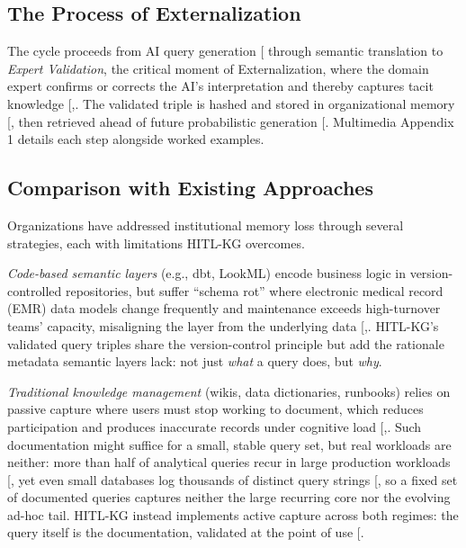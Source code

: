 \documentclass[
  american,
  11pt,
  letterpaper,
  oneside  ,captions=tableheading
]{scrartcl}
\begin{document}
\subsection{The Process of
Externalization}\label{the-process-of-externalization}

The cycle proceeds from AI query generation
{[}\citeproc{ref-lee2023}{28}{]} through semantic translation to
\emph{Expert Validation}, the critical moment of Externalization, where
the domain expert confirms or corrects the AI's interpretation and
thereby captures tacit knowledge
{[},\citeproc{ref-mosqueirarey2023}{30}{]}.
The validated triple is hashed and stored in organizational memory
{[}\citeproc{ref-benbya2004}{31}{]}, then retrieved ahead of future
probabilistic generation {[}\citeproc{ref-whittaker2008}{32}{]}.
Multimedia Appendix 1 details each step alongside worked examples.

\subsection{Comparison with Existing
Approaches}\label{comparison-with-existing-approaches}

Organizations have addressed institutional memory loss through several
strategies, each with limitations HITL-KG overcomes.

\emph{Code-based semantic layers} (e.g., dbt, LookML) encode business
logic in version-controlled repositories, but suffer ``schema rot''
where electronic medical record (EMR) data models change frequently and
maintenance exceeds high-turnover teams' capacity, misaligning the layer
from the underlying data
{[},\citeproc{ref-battula2025}{34}{]}.
HITL-KG's validated query triples share the version-control principle
but add the rationale metadata semantic layers lack: not just
\emph{what} a query does, but \emph{why}.

\emph{Traditional knowledge management} (wikis, data dictionaries,
runbooks) relies on passive capture where users must stop working to
document, which reduces participation and produces inaccurate records
under cognitive load
{[},\citeproc{ref-goffin2011}{25}{]}. Such
documentation might suffice for a small, stable query set, but real
workloads are neither: more than half of analytical queries recur in
large production workloads {[}\citeproc{ref-jindal2019}{35}{]}, yet even
small databases log thousands of distinct query strings
{[}\citeproc{ref-kul2018}{36}{]}, so a fixed set of documented queries
captures neither the large recurring core nor the evolving ad-hoc tail.
HITL-KG instead implements active capture across both regimes: the query
itself is the documentation, validated at the point of use
{[}\citeproc{ref-moore2018}{26}{]}.
\end{document}
